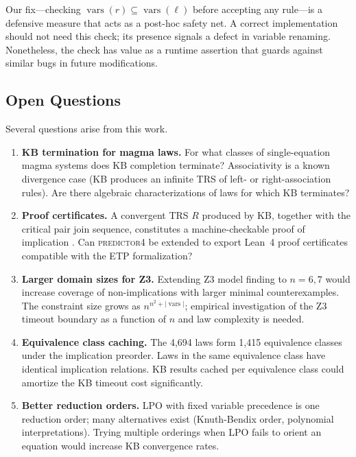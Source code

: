 Our fix---checking $\operatorname{vars}(r) \subseteq \operatorname{vars}(\ell)$ before accepting any rule---is
a defensive measure that acts as a post-hoc safety net.  A correct implementation
should not need this check; its presence signals a defect in variable renaming.
Nonetheless, the check has value as a runtime assertion that guards against similar
bugs in future modifications.

\subsection{Open Questions}

Several questions arise from this work.

\begin{enumerate}[(1)]
  \item \textbf{KB termination for magma laws.}
        For what classes of single-equation magma systems does KB completion
        terminate?  Associativity is a known divergence case (KB produces an
        infinite TRS of left- or right-association rules).  Are there algebraic
        characterizations of laws for which KB terminates?

  \item \textbf{Proof certificates.}
        A convergent TRS $R$ produced by KB, together with the critical pair
        join sequence, constitutes a machine-checkable proof of implication
        \cite{sternagel2012recording}.  Can \textsc{predictor4} be extended to
        export Lean~4 proof certificates compatible with the ETP formalization?

  \item \textbf{Larger domain sizes for Z3.}
        Extending Z3 model finding to $n = 6, 7$ would increase coverage of
        non-implications with larger minimal counterexamples.  The constraint
        size grows as $n^{n^2 + |\operatorname{vars}|}$; empirical investigation of the
        Z3 timeout boundary as a function of $n$ and law complexity is needed.

  \item \textbf{Equivalence class caching.}
        The 4,694 laws form 1,415 equivalence classes under the implication preorder.
        Laws in the same equivalence class have identical implication relations.
        KB results cached per equivalence class could amortize the KB timeout
        cost significantly.

  \item \textbf{Better reduction orders.}
        LPO with fixed variable precedence is one reduction order; many alternatives
        exist (Knuth-Bendix order, polynomial interpretations).  Trying multiple
        orderings when LPO fails to orient an equation would increase KB convergence
        rates.
\end{enumerate}
